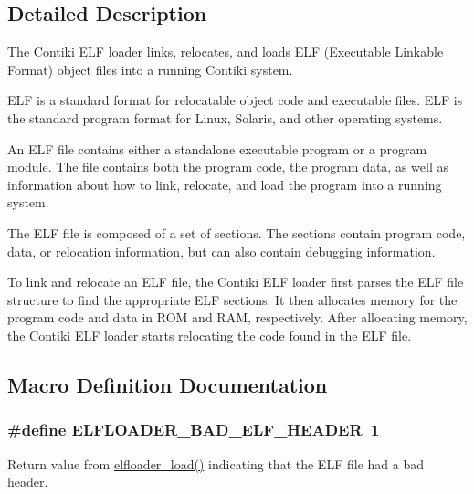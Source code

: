 \subsection{Detailed Description}
The Contiki E\+L\+F loader links, relocates, and loads E\+L\+F (Executable Linkable Format) object files into a running Contiki system.

E\+L\+F is a standard format for relocatable object code and executable files. E\+L\+F is the standard program format for Linux, Solaris, and other operating systems.

An E\+L\+F file contains either a standalone executable program or a program module. The file contains both the program code, the program data, as well as information about how to link, relocate, and load the program into a running system.

The E\+L\+F file is composed of a set of sections. The sections contain program code, data, or relocation information, but can also contain debugging information.

To link and relocate an E\+L\+F file, the Contiki E\+L\+F loader first parses the E\+L\+F file structure to find the appropriate E\+L\+F sections. It then allocates memory for the program code and data in R\+O\+M and R\+A\+M, respectively. After allocating memory, the Contiki E\+L\+F loader starts relocating the code found in the E\+L\+F file. 

\subsection{Macro Definition Documentation}
\hypertarget{group__elfloader_gadc23fd3bb068baab21e0719f5272f5f4}{}
\subsubsection[{E\+L\+F\+L\+O\+A\+D\+E\+R\+\_\+\+B\+A\+D\+\_\+\+E\+L\+F\+\_\+\+H\+E\+A\+D\+E\+R}]{\setlength{\rightskip}{0pt plus 5cm}\#define E\+L\+F\+L\+O\+A\+D\+E\+R\+\_\+\+B\+A\+D\+\_\+\+E\+L\+F\+\_\+\+H\+E\+A\+D\+E\+R~1}\label{group__elfloader_gadc23fd3bb068baab21e0719f5272f5f4}
Return value from \hyperlink{group__elfloader_ga57190d49fcc860d9a780f2860e896a5b}{elfloader\+\_\+load()} indicating that the E\+L\+F file had a bad header. \hypertarget{group__elfloader_ga98dc2983b4456dc3484f1144347da8d2}{}
